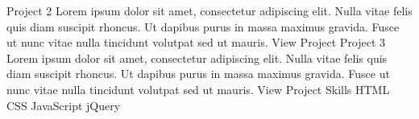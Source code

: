 \documentclass[letterpaper,10pt,russian]{sphinxmanual}
\begin{document}
\begin{sphinxVerbatim}[commandchars=\\\{\}]
                Project 2
                Lorem ipsum dolor sit amet, consectetur adipiscing elit. Nulla vitae felis quis diam suscipit rhoncus. Ut dapibus purus in massa maximus gravida. Fusce ut nunc vitae nulla tincidunt volutpat sed ut mauris.
                 View Project
             
                  
                Project 3
                Lorem ipsum dolor sit amet, consectetur adipiscing elit. Nulla vitae felis quis diam suscipit rhoncus. Ut dapibus purus in massa maximus gravida. Fusce ut nunc vitae nulla tincidunt volutpat sed ut mauris.
                 View Project
         
            Skills
                HTML
                CSS
                JavaScript
                jQuery

\end{sphinxVerbatim}
\end{document}
